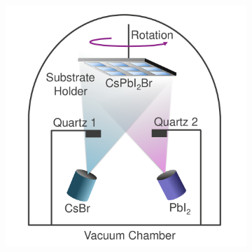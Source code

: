 \begin{figure}[htbp]
    \centering
    \begin{subfigure}[t]{0.49\textwidth} %
        \centering
        \includegraphics[width=\textwidth]{chapters/material_properties/images/Chamber.pdf} %
        \caption{}
        \label{}
    \end{subfigure}
    \hfill %
    \begin{subfigure}[t]{0.49\textwidth} %
        \centering        
        \caption{}
        \label{}
    \end{subfigure}


\end{figure}
